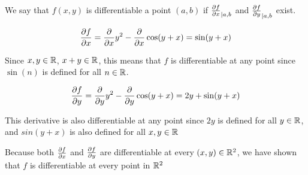 \documentclass[12pt]{article} %
\begin{document}
\begin{homeworkProblem}

    We say that $f(x, y)$ is differentiable a point $(a, b)$ if $\frac{\partial f}{\partial x}_{\mid {a, b}}$ and $\frac{\partial f}{\partial y}_{\mid {a, b}}$ exist.

    $$
        \frac{\partial f}{\partial x} = \frac{\partial}{\partial x} y^2 - \frac{\partial}{\partial x} \cos(y + x) = \sin(y + x)
    $$

    Since $x, y \in \mathbb{R}$, $x + y \in \mathbb{R}$, this means that $f$ is differentiable at any point since $\sin(n)$ is defined for all $n \in \mathbb{R}$.

    $$
        \frac{\partial f}{\partial y} = \frac{\partial}{\partial y} y^2 - \frac{\partial}{\partial y} \cos(y + x) = 2y + \sin(y + x)
    $$

    This derivative is also differentiable at any point since $2y$ is defined for all $y \in \mathbb{R}$, and $sin(y + x)$ is also defined for all $x, y \in \mathbb{R}$

    Because both $\frac{\partial f}{\partial x}$ and $\frac{\partial f}{\partial y}$ are differentiable at every $(x, y) \in \mathbb{R}^2$, we have shown that $f$ is differentiable at every point in $\mathbb{R}^2$

\end{homeworkProblem}
\pagebreak
\end{document}
